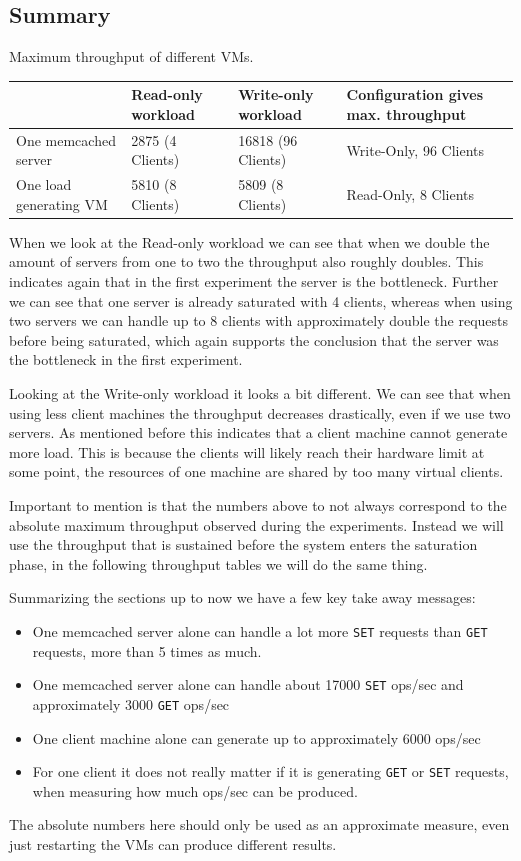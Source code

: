 \documentclass[11pt,a4paper]{article}
\begin{document}
\subsection{Summary}
%
\begin{center}
	{Maximum throughput of different VMs.}
	\begin{tabular}{|l|p{3cm}|p{3cm}|p{4cm}|}
		\hline                        & Read-only workload & Write-only workload & Configuration gives max. throughput \\ 
		\hline One memcached server   & 2875 (4 Clients)   & 	16818 (96 Clients)  & Write-Only, 96 Clients       \\ 
		\hline One load generating VM & 5810 (8 Clients)  & 5809 (8 Clients)   & Read-Only, 8 Clients         \\ 
		\hline 
	\end{tabular}
\end{center}
%
When we look at the Read-only workload we can see that when we double the amount of servers from one to two the throughput also roughly doubles. 
%
This indicates again that in the first experiment the server is the bottleneck.
%
Further we can see that one server is already saturated with 4 clients, whereas when using two servers we can handle up to 8 clients with approximately double the requests before being saturated, which again supports the conclusion that the server was the bottleneck in the first experiment.
%
\par
%
Looking at the Write-only workload it looks a bit different.
%
We can see that when using less client machines the throughput decreases drastically, even if we use two servers.
%
As mentioned before this indicates that a client machine cannot generate more load.
%
This is because the clients will likely reach their hardware limit at some point, the resources of one machine are shared by too many virtual clients.
%
\par
%
Important to mention is that the numbers above to not always correspond to the absolute maximum throughput observed during the experiments.
%
Instead we will use the throughput that is sustained before the system enters the saturation phase, in the following throughput tables we will do the same thing.
%
\par
%
Summarizing the sections up to now we have a few key take away messages:
%
\begin{itemize}
	\item One memcached server alone can handle a lot more \texttt{SET} requests than \texttt{GET} requests, more than 5 times as much.
	\item One memcached server alone can handle about 17000 \texttt{SET} ops/sec and approximately 3000 \texttt{GET} ops/sec
	\item One client machine alone can generate up to approximately 6000 ops/sec
	\item For one client it does not really matter if it is generating \texttt{GET} or \texttt{SET} requests, when measuring how much ops/sec can be produced.
\end{itemize}
%
The absolute numbers here should only be used as an approximate measure, even just restarting the VMs can produce different results. 
%
\end{document}
